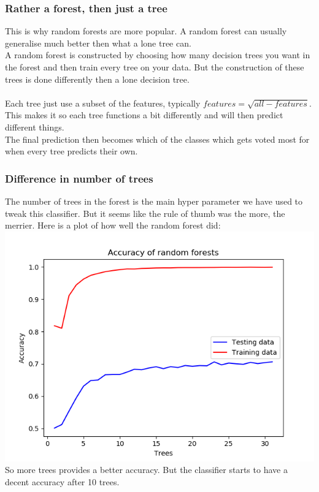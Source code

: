 \documentclass[parskip=half]{scrartcl}
\theoremstyle{definition}
\theoremstyle{remark}
\begin{document}
\subsubsection{Rather a forest, then just a tree}
This is why random forests are more popular. A random forest can usually generalise much better then what a lone tree can.\\
A random forest is constructed by choosing how many decision trees you want in the forest and then train every tree on your data. But the construction of these trees is done differently then a lone decision tree.\\
\\
Each tree just use a subset of the features, typically $ features = \sqrt{all-features}$. This makes it so each tree functions a bit differently and will then predict different things.\\
The final prediction then becomes which of the classes which gets voted most for when every tree predicts their own.
\subsubsection{Difference in number of trees}
The number of trees in the forest is the main hyper parameter we have used to tweak this classifier. But it seems like the rule of thumb was the more, the merrier.
Here is a plot of how well the random forest did:\\
\includegraphics[scale=.7]{images/32treesAcc}\\
So more trees provides a better accuracy. But the classifier starts to have a decent accuracy after 10 trees.
\end{document}
